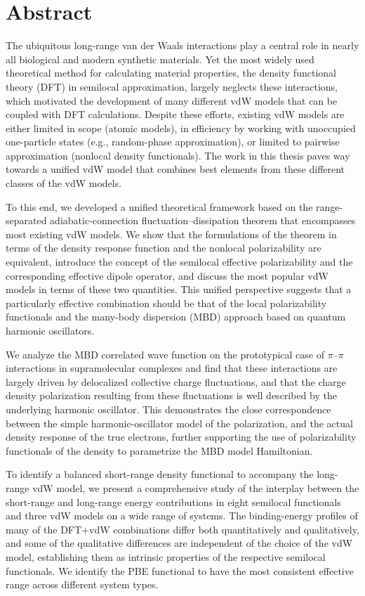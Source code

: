 \section*{Abstract}

The ubiquitous long-range van der Waals interactions play a central role in nearly all biological and modern synthetic materials.
Yet the most widely used theoretical method for calculating material properties, the density functional theory (DFT) in semilocal approximation, largely neglects these interactions, which motivated the development of many different vdW models that can be coupled with DFT calculations.
Despite these efforts, existing vdW models are either limited in scope (atomic models), in efficiency by working with unoccupied one-particle states (e.g., random-phase approximation), or limited to pairwise approximation (nonlocal density functionals).
The work in this thesis paves way towards a unified vdW model that combines best elements from these different classes of the vdW models.

To this end, we developed a unified theoretical framework based on the range-separated adiabatic-connection fluctuation--dissipation theorem that encompasses most existing vdW models.
We show that the formulations of the theorem in terms of the density response function and the nonlocal polarizability are equivalent, introduce the concept of the semilocal effective polarizability and the corresponding effective dipole operator, and discuss the most popular vdW models in terms of these two quantities.
This unified perspective suggests that a particularly effective combination should be that of the local polarizability functionals and the many-body dispersion (MBD) approach based on quantum harmonic oscillators.

We analyze the MBD correlated wave function on the prototypical case of $\pi$--$\pi$ interactions in supramolecular complexes and find that these interactions are largely driven by delocalized collective charge fluctuations, and that the charge density polarization resulting from these fluctuations is well described by the underlying harmonic oscillator.
This demonstrates the close correspondence between the simple harmonic-oscillator model of the polarization, and the actual density response of the true electrons, further supporting the use of polarizability functionals of the density to parametrize the MBD model Hamiltonian.

To identify a balanced short-range density functional to accompany the long-range vdW model, we present a comprehensive study of the interplay between the short-range and long-range energy contributions in eight semilocal functionals and three vdW models on a wide range of systems.
The binding-energy profiles of many of the DFT+vdW combinations differ both quantitatively and qualitatively, and some of the qualitative differences are independent of the choice of the vdW model, establishing them as intrinsic properties of the respective semilocal functionals.
We identify the PBE functional to have the most consistent effective range across different system types.

